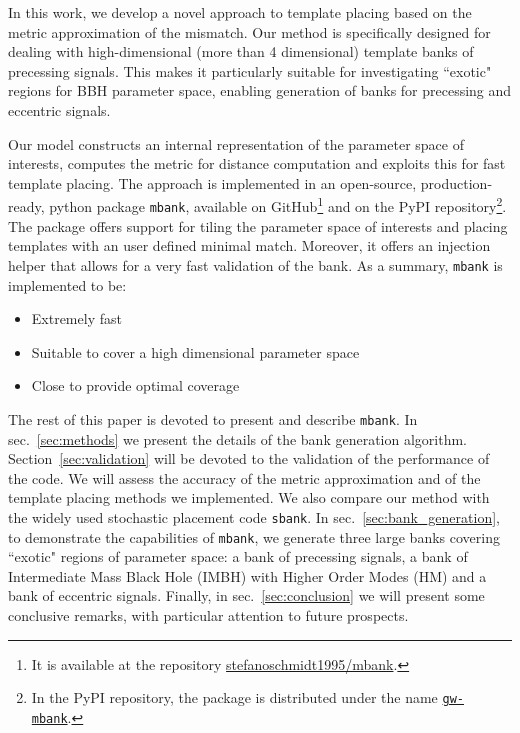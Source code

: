 \documentclass[twocolumn,showpacs,preprintnumbers,nofootinbib,prd,
superscriptaddress,10pt]{revtex4-2}
\newcommand{\stefano}[1]{{\textcolor{blue}{\texttt{SS: #1}} }}
\newcommand{\sarah}[1]{{\textcolor{red}{\texttt{SC: #1}} }}
\begin{document}
In this work, we develop a novel approach to template placing based on the metric approximation of the mismatch.
Our method is specifically designed for dealing with high-dimensional (more than 4 dimensional) template banks of precessing signals. This makes it particularly suitable for investigating ``exotic" regions for BBH parameter space, enabling generation of banks for precessing and eccentric signals.

Our model constructs an internal representation of the parameter space of interests, computes the metric for distance computation and exploits this for fast template placing.
The approach is implemented in an open-source, production-ready, python package \texttt{mbank}, available on GitHub\footnote{
It is available at the repository \href{https://github.com/stefanoschmidt1995/mbank}{stefanoschmidt1995/mbank}.}
and on the PyPI repository\footnote{
In the PyPI repository, the package is distributed under the name \texttt{\href{https://pypi.org/project/gw-mbank/}{gw-mbank}}.
}.
The package offers support for tiling the parameter space of interests and placing templates with an user defined minimal match. Moreover, it offers an injection helper that allows for a very fast validation of the bank.
As a summary, \texttt{mbank} is implemented to be:
\begin{itemize}
	\item Extremely fast
	\item Suitable to cover a high dimensional parameter space
	\item Close to provide optimal coverage
\end{itemize}

The rest of this paper is devoted to present and describe \texttt{mbank}.
In sec.~\ref{sec:methods} we present the details of the bank generation algorithm.
Section~\ref{sec:validation} will be devoted to the validation of the performance of the code. We will assess the accuracy of the metric approximation and of the template placing methods we implemented. We also compare our method with the widely used stochastic placement code \texttt{sbank}.
In sec.~\ref{sec:bank_generation}, to demonstrate the capabilities of \texttt{mbank}, we generate three large banks covering ``exotic" regions of parameter space: a bank of precessing signals, a bank of Intermediate Mass Black Hole (IMBH) with Higher Order Modes (HM) and a bank of eccentric signals.
Finally, in sec.~\ref{sec:conclusion} we will present some conclusive remarks, with particular attention to future prospects.
\end{document}
